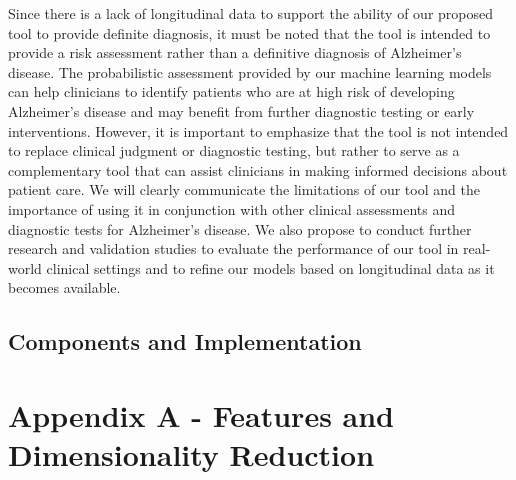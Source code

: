\documentclass[openany]{book}
\begin{document}
Since there is a lack of longitudinal data to support the ability of our proposed tool to provide definite diagnosis, it must be noted that the tool is intended to provide a risk assessment rather than a definitive diagnosis of Alzheimer's disease. The probabilistic assessment provided by our machine learning models can help clinicians to identify patients who are at high risk of developing Alzheimer's disease and may benefit from further diagnostic testing or early interventions. However, it is important to emphasize that the tool is not intended to replace clinical judgment or diagnostic testing, but rather to serve as a complementary tool that can assist clinicians in making informed decisions about patient care. We will clearly communicate the limitations of our tool and the importance of using it in conjunction with other clinical assessments and diagnostic tests for Alzheimer's disease. We also propose to conduct further research and validation studies to evaluate the performance of our tool in real-world clinical settings and to refine our models based on longitudinal data as it becomes available. \\

\section{Components and Implementation}


\chapter*{Appendix A - Features and Dimensionality Reduction}
\end{document}
